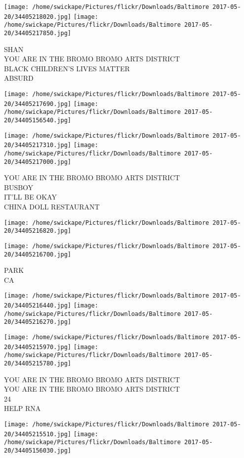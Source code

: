 \documentclass[10pt,letterpaper]{article}
\begin{document}
\texttt{[image: /home/swickape/Pictures/flickr/Downloads/Baltimore 2017-05-20/34405218020.jpg]}
\texttt{[image: /home/swickape/Pictures/flickr/Downloads/Baltimore 2017-05-20/34405217850.jpg]}

SHAN\\
YOU ARE IN THE BROMO BROMO ARTS DISTRICT\\
BLACK CHILDREN'S LIVES MATTER\\
ABSURD
\pagebreak

\texttt{[image: /home/swickape/Pictures/flickr/Downloads/Baltimore 2017-05-20/34405217690.jpg]}
\texttt{[image: /home/swickape/Pictures/flickr/Downloads/Baltimore 2017-05-20/34405156540.jpg]}

\texttt{[image: /home/swickape/Pictures/flickr/Downloads/Baltimore 2017-05-20/34405217310.jpg]}
\texttt{[image: /home/swickape/Pictures/flickr/Downloads/Baltimore 2017-05-20/34405217000.jpg]}

YOU ARE IN THE BROMO BROMO ARTS DISTRICT\\
BUSBOY\\
IT'LL BE OKAY\\
CHINA DOLL RESTAURANT
\pagebreak

\texttt{[image: /home/swickape/Pictures/flickr/Downloads/Baltimore 2017-05-20/34405216820.jpg]}

\vspace{0.25in}
\texttt{[image: /home/swickape/Pictures/flickr/Downloads/Baltimore 2017-05-20/34405216700.jpg]}

PARK\\
CA
\pagebreak

\texttt{[image: /home/swickape/Pictures/flickr/Downloads/Baltimore 2017-05-20/34405216440.jpg]}
\texttt{[image: /home/swickape/Pictures/flickr/Downloads/Baltimore 2017-05-20/34405216270.jpg]}

\texttt{[image: /home/swickape/Pictures/flickr/Downloads/Baltimore 2017-05-20/34405215970.jpg]}
\texttt{[image: /home/swickape/Pictures/flickr/Downloads/Baltimore 2017-05-20/34405215780.jpg]}

YOU ARE IN THE BROMO BROMO ARTS DISTRICT\\
YOU ARE IN THE BROMO BROMO ARTS DISTRICT\\
24\\
HELP RNA
\pagebreak

\texttt{[image: /home/swickape/Pictures/flickr/Downloads/Baltimore 2017-05-20/34405215510.jpg]}
\texttt{[image: /home/swickape/Pictures/flickr/Downloads/Baltimore 2017-05-20/34405156030.jpg]}
\end{document}
